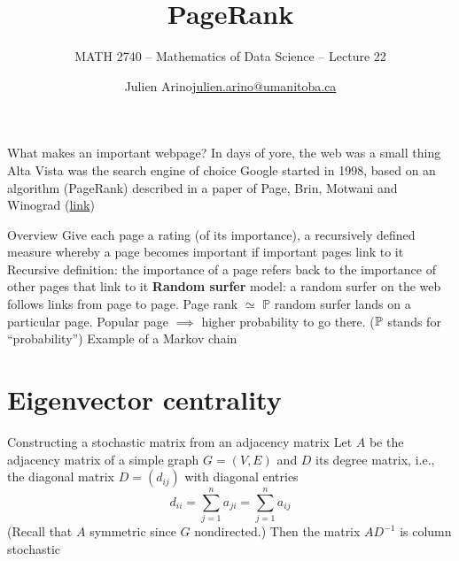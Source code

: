 \documentclass[aspectratio=169]{beamer}\usepackage[]{graphicx}\usepackage[]{xcolor}
\subtitle{MATH 2740 -- Mathematics of Data Science -- Lecture 22}
\author{\texorpdfstring{Julien Arino\newline\url{julien.arino@umanitoba.ca}}{Julien Arino}}
\institute{Department of Mathematics @ University of Manitoba}
\title{PageRank}
\begin{document}


\begin{frame}{What makes an important webpage?}
	In days of yore, the web was a small thing
	\vfill
	Alta Vista was the search engine of choice
	\vfill
	Google started in 1998, based on an algorithm (PageRank) described in a paper of Page, Brin, Motwani and Winograd (\href{https://storm.cis.fordham.edu/~gweiss/selected-papers/classic-pagerank-paper.pdf}{link})
\end{frame}

\begin{frame}{Overview}
	Give each page a rating (of its importance), a recursively defined measure whereby a page becomes important if important pages link to it
	\vfill
	Recursive definition: the importance of a page refers back to the importance of other pages that link to it
	\vfill
	\textbf{Random surfer} model: a random surfer on the web follows links from page to page. Page rank $\simeq$ $\mathbb{P}$ random surfer lands on a particular page. Popular page $\implies$ higher probability to go there.  
	($\mathbb{P}$ stands for ``probability'')
	\vfill Example of a Markov chain
\end{frame}

\section{Eigenvector centrality}

\begin{frame}{Constructing a stochastic matrix from an adjacency matrix}
	Let $A$ be the adjacency matrix of a simple graph $G=(V,E)$ and $D$ its degree matrix, i.e., the diagonal matrix $D=(d_{ij})$ with diagonal entries
	\[
		d_{ii} = \sum_{j=1}^n a_{ji} =\sum_{j=1}^n a_{ij}
	\]
	(Recall that $A$ symmetric since $G$ nondirected.)
	Then the matrix $AD^{-1}$ is column stochastic
\end{frame}
\end{document}
